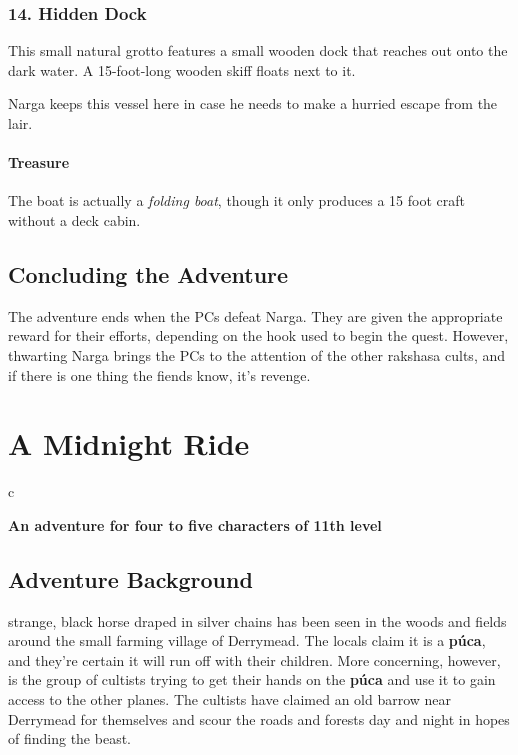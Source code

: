 \documentclass[10pt,a4paper,twoside,bg=print,twocolumn,openany,nodeprecatedcode]{dndbook}
\begin{document}
\subsection{14. Hidden Dock}
\begin{DndReadAloud}{}
This small natural grotto features a small wooden dock that reaches out onto the dark water. A 15-foot-long wooden skiff floats next to it.

\end{DndReadAloud}

Narga keeps this vessel here in case he needs to make a hurried escape from the lair.

\subsubsection{Treasure}
The boat is actually a \textit{folding boat}, though it only produces a 15 foot craft without a deck cabin.

\section{Concluding the Adventure}
The adventure ends when the PCs defeat Narga. They are given the appropriate reward for their efforts, depending on the hook used to begin the quest. However, thwarting Narga brings the PCs to the attention of the other rakshasa cults, and if there is one thing the fiends know, it's revenge.

\chapter{A Midnight Ride}

\begin{DndTable}{c}

\textbf{An adventure for four to five characters of 11th level}\\
\end{DndTable}

\section{Adventure Background}
 strange, black horse draped in silver chains has been seen in the woods and fields around the small farming village of Derrymead. The locals claim it is a \textbf{púca}, and they're certain it will run off with their children. More concerning, however, is the group of cultists trying to get their hands on the \textbf{púca} and use it to gain access to the other planes. The cultists have claimed an old barrow near Derrymead for themselves and scour the roads and forests day and night in hopes of finding the beast.
\end{document}
